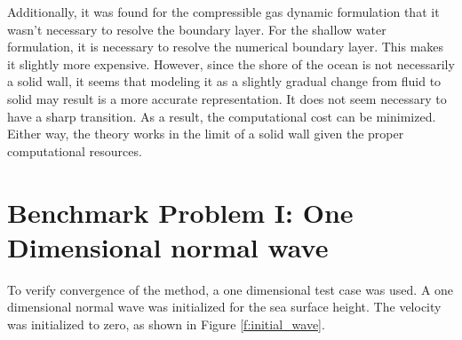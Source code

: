Additionally, it was found for the compressible gas dynamic formulation that it wasn't necessary to resolve the boundary layer.  For the shallow water formulation, it is necessary to resolve the numerical boundary layer.  This makes it slightly more expensive.  However, since the shore of the ocean is not necessarily a solid wall, it seems that modeling it as a slightly gradual change from fluid to solid may result is a more accurate representation.  It does not seem necessary to have a sharp transition.  As a result, the computational cost can be minimized.  Either way, the theory works in the limit of a solid wall given the proper computational resources.  

\section{Benchmark Problem I: One Dimensional normal wave}

To verify convergence of the method, a one dimensional test case was used.  A one dimensional normal wave was initialized for the sea surface height.  The velocity was initialized to zero, as shown in Figure \ref{f:initial_wave}.  

